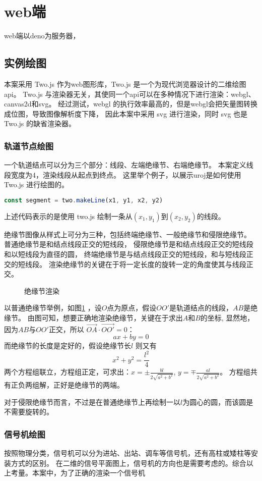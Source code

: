 \section{web端}
web端以deno为服务器，
\subsection{实例绘图}
本案采用 Two.js 作为web图形库，Two.js 是一个为现代浏览器设计的二维绘图api。
Two.js 与渲染器无关，其使同一个api可以在多种情况下进行渲染：webgl、canvas2d和svg。
经过测试，webgl 的执行效率最高的，但是webgl会把矢量图转换成位图，导致图像解析度下降，
因此本案中采用 svg 进行渲染，同时 svg 也是 Two.js 的缺省渲染器。
\subsubsection{轨道节点绘图}
一个轨道结点可以分为三个部分：线段、左端绝缘节、右端绝缘节。
本案定义线段宽度为4，渲染线段从起点到终点。
这里举个例子，以展示uroj是如何使用Two.js 进行绘图的。
\begin{lstlisting}[language = JavaScript]
const segment = two.makeLine(x1, y1, x2, y2)
\end{lstlisting}
上述代码表示的是使用 two.js 绘制一条从$(x_1, y_1)$到$(x_2, y_2)$的线段。

绝缘节图像从样式上可分为三种，包括终端绝缘节、一般绝缘节和侵限绝缘节。
普通绝缘节是和结点线段正交的短线段，
侵限绝缘节是和结点线段正交的短线段和以短线段为直径的圆，
终端绝缘节是与结点线段正交的短线段，和与短线段正交的短线段。 
渲染绝缘节的关键在于将一定长度的旋转一定的角度使其与线段正交。

\begin{figure}[ht]
    \centering
    
    \caption{\label{node}绝缘节渲染}
\end{figure}

以普通绝缘节举例，如图\ref{node} ，设$O$点为原点，假设$OO'$是轨道结点的线段，$AB$是绝缘节。
由图可知，想要正确地渲染绝缘节，关键在于求出$A$和$B$的坐标,
显然地，因为$AB$与$OO'$正交，所以 $\overrightarrow {OA} \cdot \overrightarrow {OO'} = 0$：
$$ax + by = 0$$
而绝缘节的长度是定好的，假设绝缘节长$l$ 则又有
$$x^2 + y^2 = \frac{l^2}{4}$$
两个方程组联立，方程组正定，可求出：$\displaystyle x = \pm \frac{bl}{2\sqrt{a^2+b^2}}$,
$\displaystyle y = \mp \frac{al}{2\sqrt{a^2+b^2}}$。
方程组共有正负两组解，正好是绝缘节的两端。

对于侵限绝缘节而言，不过是在普通绝缘节上再绘制一以$l$为圆心的圆，而该圆是不需要旋转的。

\subsubsection{信号机绘图}
按照物理分类，信号机可以分为进站、出站、调车等信号机，还有高柱或矮柱等安装方式的区别。
在二维的信号平面图上，信号机的方向也是需要考虑的。综合以上考量。本案中，为了正确的渲染一个信号机

